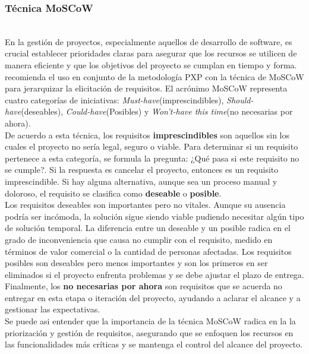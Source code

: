 \subsubsection{Técnica MoSCoW}\hfill\\ 
\indent
En la gestión de proyectos, especialmente aquellos de desarrollo de software, es crucial establecer prioridades claras para asegurar que los recursos se utilicen de manera eficiente y que los objetivos del proyecto se cumplan en tiempo y forma. \textcite{marthasari2018personal} recomienda el uso en conjunto de la metodología PXP con la técnica de MoSCoW para jerarquizar la elicitación de requisitos. El acrónimo MoSCoW representa cuatro categorías de iniciativas: \textit{Must-have}(imprescindibles), \textit{Should-have}(deseables), \textit{Could-have}(Posibles) y  \textit{Won’t-have this time}(no necesarias por ahora). \\  \indent
De acuerdo a esta técnica, los requisitos \textbf{imprescindibles} son aquellos sin los cuales el proyecto no sería legal, seguro o viable. Para determinar si un requisito pertenece a esta categoría, se formula la pregunta: ¿Qué pasa si este requisito no se cumple?. Si la respuesta es cancelar el proyecto, entonces es un requisito imprescindible. Si hay alguna alternativa, aunque sea un proceso manual y doloroso, el requisito se clasifica como \textbf{deseable} o \textbf{posible}.
\\ \noindent
Los requisitos deseables son importantes pero no vitales. Aunque su ausencia podría ser incómoda, la solución sigue siendo viable pudiendo necesitar algún tipo de solución temporal. La diferencia entre un deseable y un posible radica en el grado de inconveniencia que causa no cumplir con el requisito, medido en términos de valor comercial o la cantidad de personas afectadas. Los requisitos posibles son deseables pero menos importantes y son los primeros en ser eliminados si el proyecto enfrenta problemas y se debe ajustar el plazo de entrega. Finalmente, los \textbf{no necesarias por ahora} son requisitos que se acuerda no entregar en esta etapa o iteración del proyecto, ayudando a aclarar el alcance y a gestionar las expectativas.\\
Se puede asi entender que la importancia de la técnica MoSCoW radica en la la priorización y gestión de requisitos, asegurando que se enfoquen los recursos en las funcionalidades más críticas y se mantenga el control del alcance del proyecto.

